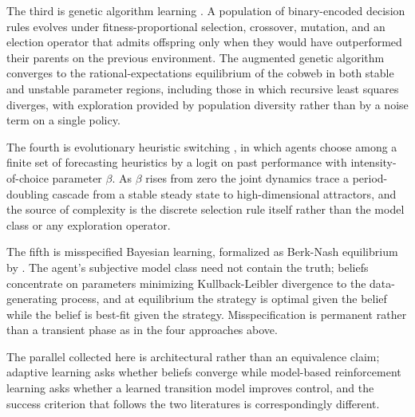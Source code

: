 The third is genetic algorithm learning \citep{Arifovic1994, Arifovic1995}. A population of binary-encoded decision rules evolves under fitness-proportional selection, crossover, mutation, and an election operator that admits offspring only when they would have outperformed their parents on the previous environment. The augmented genetic algorithm converges to the rational-expectations equilibrium of the cobweb in both stable and unstable parameter regions, including those in which recursive least squares diverges, with exploration provided by population diversity rather than by a noise term on a single policy.

The fourth is evolutionary heuristic switching \citep{BrockHommes1997}, in which agents choose among a finite set of forecasting heuristics by a logit on past performance with intensity-of-choice parameter $\beta$. As $\beta$ rises from zero the joint dynamics trace a period-doubling cascade from a stable steady state to high-dimensional attractors, and the source of complexity is the discrete selection rule itself rather than the model class or any exploration operator.

The fifth is misspecified Bayesian learning, formalized as Berk-Nash equilibrium by \citet{EspondaPouzo2016}. The agent's subjective model class need not contain the truth; beliefs concentrate on parameters minimizing Kullback-Leibler divergence to the data-generating process, and at equilibrium the strategy is optimal given the belief while the belief is best-fit given the strategy. Misspecification is permanent rather than a transient phase as in the four approaches above.

The parallel collected here is architectural rather than an equivalence claim; adaptive learning asks whether beliefs converge while model-based reinforcement learning asks whether a learned transition model improves control, and the success criterion that follows the two literatures is correspondingly different.

